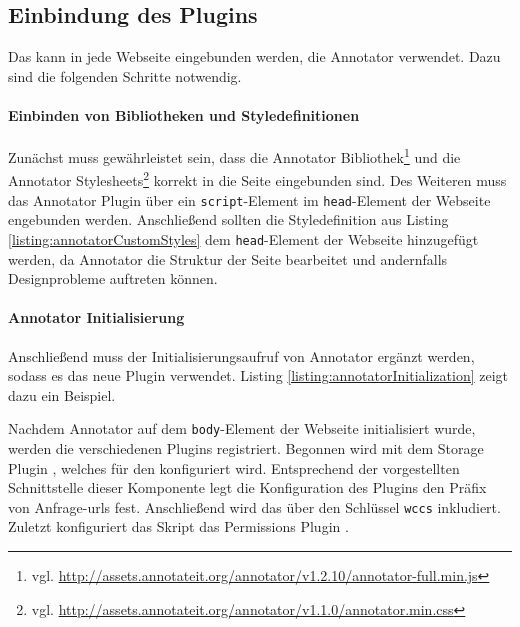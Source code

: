 \subsection{Einbindung des Plugins}
    \label{section:solutionDetailsAnnotatorPluginIntegration}
    Das {\annotatorPlugin} kann in jede Webseite eingebunden werden,
    die Annotator verwendet.
    Dazu sind die folgenden Schritte notwendig.

    \paragraph{Einbinden von Bibliotheken und Styledefinitionen}
    Zunächst muss gewährleistet sein, dass die
    Annotator Bibliothek\footnote{vgl. \url{http://assets.annotateit.org/annotator/v1.2.10/annotator-full.min.js}}
    und die Annotator Stylesheets\footnote{vgl. \url{http://assets.annotateit.org/annotator/v1.1.0/annotator.min.css}}
    korrekt in die Seite eingebunden sind.
    Des Weiteren muss das Annotator Plugin über ein \texttt{script}-Element
    im \texttt{head}-Element der Webseite engebunden werden.
    Anschließend sollten die Styledefinition aus Listing \ref{listing:annotatorCustomStyles}
    dem \texttt{head}-Element der Webseite hinzugefügt werden,
    da Annotator die Struktur der Seite bearbeitet und andernfalls Designprobleme auftreten können.

    

    \paragraph{Annotator Initialisierung}
    Anschließend muss der Initialisierungsaufruf von Annotator ergänzt werden,
    sodass es das neue Plugin verwendet.
    Listing \ref{listing:annotatorInitialization} zeigt dazu ein Beispiel.

    

    Nachdem Annotator auf dem \texttt{body}-Element der Webseite initialisiert wurde,
    werden die verschiedenen Plugins registriert.
    Begonnen wird mit dem
    Storage Plugin \cite[Kapitel "`Plugins"']{annotator:documentation},
    welches für den {\annotationService} konfiguriert wird.
    Entsprechend der vorgestellten Schnittstelle dieser
    Komponente
    legt die Konfiguration des Plugins den Präfix von Anfrage-\glspl{url} fest.
    Anschließend wird das {\annotatorPlugin} über den Schlüssel \texttt{wccs} inkludiert.
    Zuletzt konfiguriert das Skript das
    Permissions Plugin \cite[Kapitel "`Plugins"']{annotator:documentation}.
